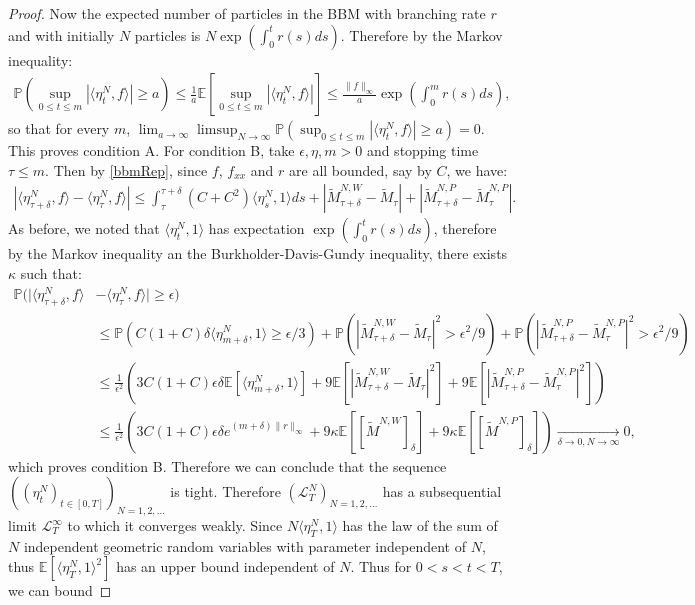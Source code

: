\documentclass{article}
\newcommand{\B}[1]{\mathbb{#1}}
\newcommand{\C}[1]{\mathcal{#1}}
\begin{document}
\begin{proof}
    Now the expected number of particles in the BBM with branching rate $r$ and with initially $N$ particles is $N\exp(\int_0^t r(s)ds)$. Therefore by the Markov inequality:
    \begin{align*}
        \B{P}(\sup_{0\leq t\leq m}|\langle \eta_t^N,f\rangle|\geq a)\leq \frac1a\B{E}[\sup_{0\leq t\leq m}|\langle \eta_t^N,f\rangle|]\leq \frac{\|f\|_\infty}{a}\exp(\int_0^m r(s)ds),
    \end{align*}
    so that for every $m$, $\lim_{a\to\infty}\limsup_{N\to\infty}\B{P}(\sup_{0\leq t\leq m}|\langle\eta_t^N,f\rangle|\geq a)=0$. This proves condition A. For condition B, take $\epsilon,\eta,m>0$ and stopping time $\tau\leq m$. Then by \eqref{bbmRep}, since $f$, $f_{xx}$ and $r$ are all bounded, say by $C$, we have:
    \begin{align*}|\langle \eta^N_{\tau+\delta},f\rangle - \langle \eta^N_\tau,f\rangle|\leq \int_{\tau}^{\tau+\delta}(C+C^2)\langle \eta_s^N,1\rangle ds + |\tilde{M}_{\tau+\delta}^{N,W}-\tilde{M}_{\tau}|+|\tilde{M}_{\tau+\delta}^{N,P}-\tilde{M}_{\tau}^{N,P}|.\end{align*}
    As before, we noted that $\langle \eta_t^N,1\rangle$ has expectation $\exp(\int_0^t r(s)ds)$, therefore by the Markov inequality an the Burkholder-Davis-Gundy inequality, there exists $\kappa$ such that:
    \begin{align*}
        \B{P}(|\langle \eta_{\tau+\delta}^N,f\rangle &- \langle \eta_\tau^N,f\rangle|\geq \epsilon)\\
        &\leq \B{P}(C(1+C)\delta\langle \eta_{m+\delta}^N,1\rangle\geq \epsilon/3) + \B{P}(|\tilde{M}_{\tau+\delta}^{N,W}-\tilde{M}_{\tau}|^2>\epsilon^2/9)+\B{P}(|\tilde{M}_{\tau+\delta}^{N,P}-\tilde{M}_{\tau}^{N,P}|^2>\epsilon^2/9)\\
        &\leq \frac{1}{\epsilon^2}\left(3C(1+C)\epsilon\delta\B{E}[\langle \eta_{m+\delta}^N,1\rangle]+9\B{E}[|\tilde{M}_{\tau+\delta}^{N,W}-\tilde{M}_{\tau}|^2]+9\B{E}[|\tilde{M}_{\tau+\delta}^{N,P}-\tilde{M}_{\tau}^{N,P}|^2]\right)\\
        &\leq \frac{1}{\epsilon^2}\left(3C(1+C)\epsilon \delta e^{(m+\delta)\|r\|_\infty}+9\kappa\B{E}[[\tilde{M}^{N,W}]_\delta]+9\kappa\B{E}[[\tilde{M}^{N,P}]_\delta]\right)\xrightarrow[\delta\to 0,N\to\infty]{}0,
    \end{align*}
    which proves condition B. Therefore we can conclude that the sequence $((\eta_t^N)_{t\in [0,T]})_{N=1,2,\ldots}$ is tight. Therefore $(\C{L}^N_T)_{N=1,2,\ldots}$ has a subsequential limit $\C{L}^\infty_T$ to which it converges weakly. Since $N\langle \eta^N_T,1\rangle$ has the law of the sum of $N$ independent geometric random variables with parameter independent of $N$, thus $\B{E}[\langle \eta_T^N,1\rangle^2]$ has an upper bound independent of $N$. Thus for $0<s<t<T$, we can bound

\end{proof}
\end{document}
